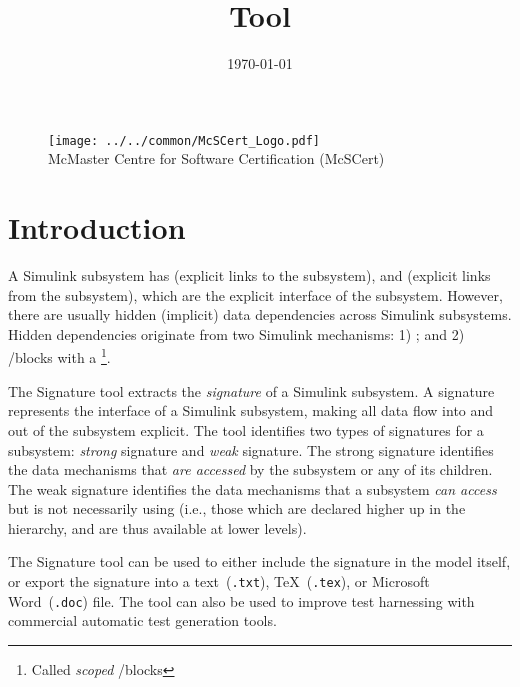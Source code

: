 \documentclass{article}
\title{\ToolName Tool}
\date{\monthyeardate\today}
\makeatletter
\newcommand{\ToolName}{Signature\@\xspace}
\makeatother
\begin{document}
\maketitle
\vfill

\begin{figure}
	\centering
	\texttt{[image: ../../common/McSCert\_Logo.pdf]} \\
	McMaster Centre for Software Certification (McSCert)
\end{figure}

\newpage

\section{Introduction}

A Simulink subsystem has  (explicit links to the subsystem), and  (explicit links from the subsystem), which are the explicit interface of the subsystem. However, there are usually hidden (implicit) data dependencies across Simulink subsystems. Hidden dependencies originate from two Simulink mechanisms: 1) \DSM; and 2) \goto/\from blocks with a \footnote{Called \emph{scoped} \goto/\from blocks}. 

The \ToolName tool extracts the \emph{signature} of a Simulink subsystem. A signature represents the interface of a Simulink subsystem, making all data flow into and out of the subsystem explicit. The tool identifies two types of signatures for a subsystem: \emph{strong} signature and \emph{weak} signature. The strong signature identifies the data mechanisms that \emph{are accessed} by the subsystem or any of its children. The weak signature identifies the data mechanisms that a subsystem \emph{can access} but is not necessarily using (i.e., those which are declared higher up in the hierarchy, and are thus available at lower levels). 

The \ToolName tool can be used to either include the signature in the model itself, or export the signature into a text~(\texttt{.txt}), \TeX~(\texttt{.tex}), or Microsoft Word~(\texttt{.doc}) file. The tool can also be used to improve test harnessing with commercial automatic test generation tools.
\end{document}
